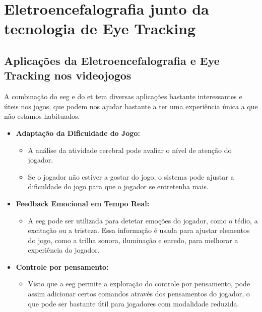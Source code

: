 \documentclass{report}
\begin{document}

\chapter{Eletroencefalografia junto da tecnologia de Eye Tracking}
\label{chap.EEGandET}

\section{Aplicações da Eletroencefalografia e Eye Tracking nos videojogos}

A combinação do \ac{eeg} e do \ac{et} tem diversas aplicações bastante interessantes e úteis nos jogos, que podem nos ajudar bastante a ter uma experiência única a que não estamos habituados. \cite{EEG&ET_VideoGames}
\begin{itemize}
    \item \textbf{Adaptação da Dificuldade do Jogo\textbf{:}}
    \begin{itemize}
        \item A análise da atividade cerebral pode avaliar o nível de atenção do jogador.
        \item Se o jogador não estiver a gostar do jogo, o sistema pode ajustar a dificuldade do jogo para que o jogador se entretenha mais.
    \end{itemize}
\end{itemize}
\begin{itemize}
    \item \textbf{Feedback Emocional em Tempo Real:}
        \begin{itemize}
            \item A \ac{eeg} pode ser utilizada para detetar emoções do jogador, como o tédio, a excitação ou a tristeza. Essa informação é usada para ajustar elementos do jogo, como a trilha sonora, iluminação e enredo, para melhorar a experiência do jogador.
        \end{itemize}
    \end{itemize}
\begin{itemize}
    \item \textbf{Controle por pensamento:}
        \begin{itemize}
            \item Visto que a \ac{eeg} permite a exploração do controle por pensamento, pode assim adicionar certos comandos através dos pensamentos do jogador, o que pode ser bastante útil para jogadores com modalidade reduzida.
        \end{itemize}
    \end{itemize}
\end{document}
